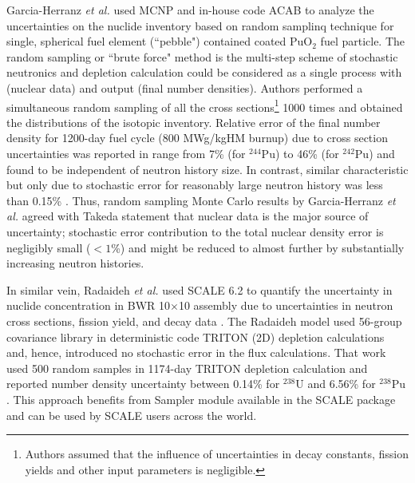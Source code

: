 Garcia-Herranz \emph{et al.} used MCNP and in-house code ACAB to analyze the 
uncertainties on the nuclide inventory based on random samplinq technique for 
single, spherical fuel element (``pebble") contained coated PuO$_2$ fuel 
particle. The random sampling or ``brute force" method is the multi-step 
scheme of stochastic neutronics and depletion calculation could be considered 
as a single process with (nuclear data) and output (final number densities). 
Authors performed a simultaneous random sampling of all the cross 
sections\footnote{Authors assumed that the influence of uncertainties in decay 
constants, fission yields and other input parameters is negligible.} 1000 
times and obtained the distributions of the isotopic inventory. Relative error 
of the final number density for 1200-day fuel cycle (800 MWg/kgHM burnup) due 
to cross section uncertainties was reported in range from 7\% (for $^{244}$Pu) 
to 46\% (for $^{242}$Pu) and found to be independent of neutron history size. 
In contrast, similar characteristic but only due to stochastic error for 
reasonably large neutron history was less than 0.15\% 
\cite{garcia-herranz_propagation_2008}. Thus, random sampling Monte Carlo 
results by Garcia-Herranz \emph{et al.} agreed with Takeda statement that 
nuclear data is the major source of uncertainty; stochastic error contribution 
to the total nuclear density error is negligibly small ($<1$\%) and might be 
reduced to almost further by substantially increasing neutron histories.

In similar vein, Radaideh \emph{et al.} used SCALE 6.2 
\cite{rearden_scale_2018} to quantify the uncertainty in nuclide concentration 
in \gls{BWR} 10$\times$10 assembly due to uncertainties in neutron cross 
sections, fission yield, and decay data \cite{radaideh_uncertainty_2018}. The 
Radaideh model used 56-group covariance library in deterministic code TRITON 
(2D) depletion calculations and, hence, introduced no stochastic error in the 
flux calculations. That work used 500 random samples in 1174-day TRITON 
depletion calculation and reported number density uncertainty between 0.14\% 
for $^{238}$U and 6.56\% for $^{238}$Pu \cite{radaideh_novel_2019-1}. This 
approach
benefits from Sampler module available in the SCALE package and 
can be used by SCALE users across the world.

